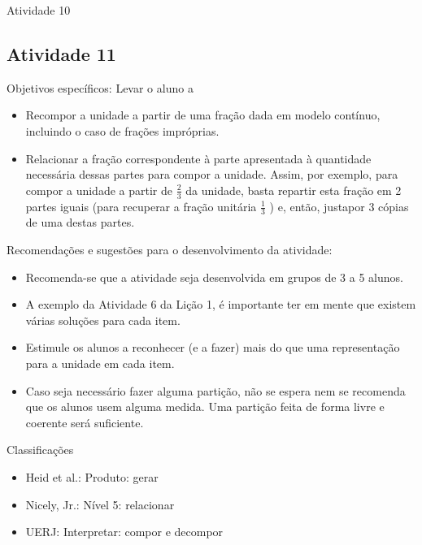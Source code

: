 \documentclass[oneside]{book}
\begin{document}
\begin{multicols}{2}
\begin{resposta*}{Atividade 10}
\end{resposta*}



\subsection{Atividade 11}





  Objetivos específicos: Levar o aluno a
\begin{itemize} %
    \item       Recompor a unidade a partir de uma fração dada em modelo contínuo, incluindo o caso de frações impróprias.
    \item       Relacionar a fração correspondente à parte apresentada à quantidade necessária dessas partes para compor a unidade. Assim, por exemplo, para compor a unidade a partir de       $\frac{2}{3}$       da unidade, basta repartir esta fração em 2 partes iguais (para recuperar a fração unitária       $\frac{1}{3}$      ) e, então, justapor 3 cópias de uma destas partes.
\end{itemize} %



  Recomendações e sugestões para o desenvolvimento da atividade:
\begin{itemize} %
    \item       Recomenda-se que a atividade seja desenvolvida em grupos de 3 a 5 alunos.
    \item       A exemplo da Atividade 6 da Lição 1, é importante ter em mente que existem várias soluções para cada item.
    \item       Estimule os alunos a reconhecer (e a fazer) mais do que uma representação para a unidade em cada item.
    \item       Caso seja necessário fazer alguma partição, não se espera nem se recomenda que os alunos usem alguma medida. Uma partição feita de forma livre e coerente será suficiente.
\end{itemize} %


  Classificações
\begin{itemize} %
    \item       Heid et al.: Produto: gerar
    \item       Nicely, Jr.: Nível 5: relacionar
    \item       UERJ: Interpretar: compor e decompor
\end{itemize} %





\end{multicols}
\end{document}
